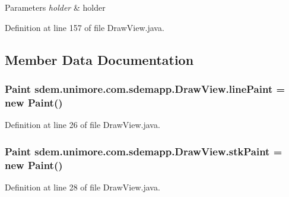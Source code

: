 \begin{DoxyParams}{Parameters}
{\em holder} & holder \\
\hline
\end{DoxyParams}


Definition at line 157 of file Draw\+View.\+java.



\subsection{Member Data Documentation}
\hypertarget{classsdem_1_1unimore_1_1com_1_1sdemapp_1_1_draw_view_aff7141153912096d916ce10eaa7db1ae}{
\subsubsection[{line\+Paint}]{\setlength{\rightskip}{0pt plus 5cm}Paint sdem.\+unimore.\+com.\+sdemapp.\+Draw\+View.\+line\+Paint = new Paint()\hspace{0.3cm}{\ttfamily [private]}}}\label{classsdem_1_1unimore_1_1com_1_1sdemapp_1_1_draw_view_aff7141153912096d916ce10eaa7db1ae}


Definition at line 26 of file Draw\+View.\+java.

\hypertarget{classsdem_1_1unimore_1_1com_1_1sdemapp_1_1_draw_view_a997f1cd0809baa7c8639f1887c6a2924}{
\subsubsection[{stk\+Paint}]{\setlength{\rightskip}{0pt plus 5cm}Paint sdem.\+unimore.\+com.\+sdemapp.\+Draw\+View.\+stk\+Paint = new Paint()\hspace{0.3cm}{\ttfamily [private]}}}\label{classsdem_1_1unimore_1_1com_1_1sdemapp_1_1_draw_view_a997f1cd0809baa7c8639f1887c6a2924}


Definition at line 28 of file Draw\+View.\+java.

